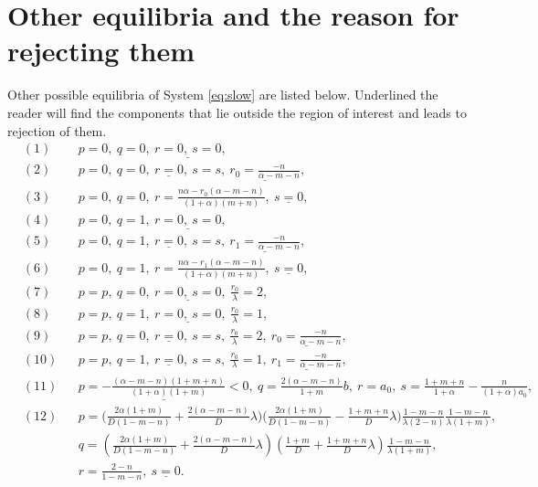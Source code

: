\documentclass[a4paper,11pt]{article}
\theoremstyle{remark}
\begin{document}
\section{Other equilibria and the reason for rejecting them}\label{append:equi_reject}
Other possible equilibria of System \eqref{eq:slow} are listed below. Underlined the reader will find the components that lie outside the region
of interest and leads to rejection of them.
\allowdisplaybreaks
\begin{align*}
 &(1) & & p=0, \ q=0, \ \underline{ r=0, \ s=0},\\
 &(2) & & p=0, \ q=0, \ \underline{ r=0},\ s=s, \ \underline{ r_0 = \frac{-n}{\alpha-m-n}},\\
 &(3) & & p=0, \ q=0, \ r = \frac{n\alpha - r_0(\alpha-m-n)}{(1+\alpha)(m+n)},\ \underline{ s=0},\\
 &(4) & & p=0, \ q=1, \ \underline{ r=0, \ s=0}, \\
 &(5) & & p=0, \ q=1, \ \underline{ r=0},\ s=s, \ \underline{ r_1 = \frac{-n}{\alpha-m-n}},\\
 &(6) & & p=0, \ q=1, \ r = \frac{n\alpha - r_1(\alpha-m-n)}{(1+\alpha)(m+n)},\ \underline{ s=0},\\
 &(7) & & p=p, \ q=0, \ \underline{ r=0, \ s=0}, \ \frac{r_0}{\lambda}=2, \\
 &(8) & & p=p, \ q=1, \ \underline{ r=0, \ s=0}, \ \frac{r_0}{\lambda}=1, \\
 &(9) & & p=p, \ q=0, \ \underline{ r=0}, \ s=s, \ \frac{r_0}{\lambda}=2, \ \underline{ r_0 = \frac{-n}{\alpha-m-n}}, \\
 &(10) & & p=p, \ q=1, \ \underline{ r=0}, \ s=s, \ \frac{r_0}{\lambda}=1, \ \underline{ r_1 = \frac{-n}{\alpha-m-n}}, \\
 &(11) & & \underline{ p=-\frac{(\alpha-m-n)(1+m+n)}{(1+\alpha)(1+m)}<0}, \ q=\frac{2(\alpha-m-n)}{1+m}b, \ r=a_0, \ s=\frac{1+m+n}{1+\alpha} - \frac{n}{(1+\alpha)a_0},\\
 &(12) & & p=\Big ( \frac{2\alpha(1+m)}{D(1-m-n)} + \frac{2(\alpha-m-n)}{D}\lambda\Big)\Big(\frac{2\alpha(1+m)}{D(1-m-n)} - \frac{1+m+n}{D}\lambda\Big)\frac{1-m-n}{\lambda(2-n)}\frac{1-m-n}{\lambda(1+m)}, \\
 & & &q=\left( \frac{2\alpha(1+m)}{D(1-m-n)} + \frac{2(\alpha-m-n)}{D}\lambda\right)\left(\frac{1+m}{D} + \frac{1+m+n}{D}\lambda\right)\frac{1-m-n}{\lambda(1+m)},\\
 & & &r = \frac{2-n}{1-m-n}, \ \underline{ s=0}.
\end{align*}
\end{document}
